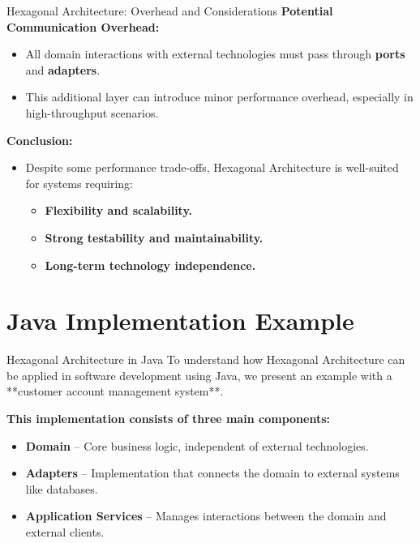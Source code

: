 \documentclass[aspectratio=169, table]{beamer}
\begin{document}
\begin{frame}[fragile]{Hexagonal Architecture: Overhead and Considerations}
	\vspace{20pt}
	\textbf{Potential Communication Overhead:}
	\begin{itemize}
		\item All domain interactions with external technologies must pass through \textbf{ports} and \textbf{adapters}.
		\item This additional layer can introduce minor performance overhead, especially in high-throughput scenarios.
	\end{itemize}
	
	\textbf{Conclusion:}
	\begin{itemize}
		\item Despite some performance trade-offs, Hexagonal Architecture is well-suited for systems requiring:
		\begin{itemize}
			\item \textbf{Flexibility and scalability.}
			\item \textbf{Strong testability and maintainability.}
			\item \textbf{Long-term technology independence.}
		\end{itemize}
	\end{itemize}
\end{frame}


\section{Java Implementation Example}

\begin{frame}[fragile]{Hexagonal Architecture in Java}
	\vspace{20pt}
	To understand how Hexagonal Architecture can be applied in software development using Java, we present an example with a **customer account management system**.
	
	\textbf{This implementation consists of three main components:}
	\begin{itemize}
		\item \textbf{Domain} – Core business logic, independent of external technologies.
		\item \textbf{Adapters} – Implementation that connects the domain to external systems like databases.
		\item \textbf{Application Services} – Manages interactions between the domain and external clients.
	\end{itemize}
\end{frame}
\end{document}
